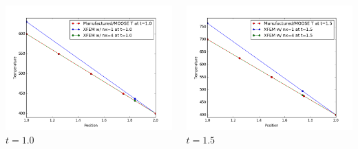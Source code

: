 \documentclass[]{beamer}
\begin{document}
\begin{frame}[t]
\begin{columns}
\begin{center}
			\includegraphics[scale=0.17]{figures/1D_rz_h1m/1D_rz_homog1mat_u_vs_x_10}\\
			$t=1.0$
			\end{center}
			\begin{center}
			\includegraphics[scale=0.17]{figures/1D_rz_h1m/1D_rz_homog1mat_u_vs_x_15}\\
			$t=1.5$			
			
			\null
			

\end{center}
\end{columns}
\end{frame}
\end{document}
